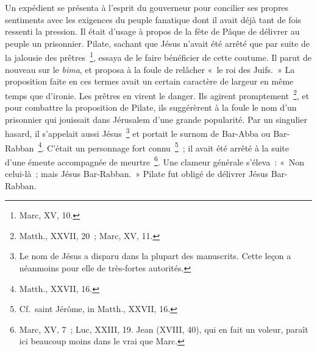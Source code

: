 \documentclass[french,twoside]{book} %
\begin{document}
Un expédient se présenta à l’esprit du gouverneur pour concilier ses propres sentiments avec les exigences du peuple fanatique dont il avait déjà tant de fois ressenti la pression. Il était d’usage à propos de la fête de Pâque de délivrer au peuple un prisonnier. Pilate, sachant que Jésus n’avait été arrêté que par suite de la jalousie des prêtres \footnote{Marc, XV, 10.}, essaya de le faire bénéficier de cette coutume. Il parut de nouveau sur le {\itshape bima}, et proposa à la foule de relâcher « le roi des Juifs. » La proposition faite en ces termes avait un certain caractère de largeur en même temps que d’ironie. Les prêtres en virent le danger. Ils agirent promptement \footnote{Matth., XXVII, 20 ; Marc, XV, 11.}, et pour combattre la proposition de Pilate, ils suggérèrent à la foule le nom d’un prisonnier qui jouissait dans Jérusalem d’une grande popularité. Par un singulier hasard, il s’appelait aussi Jésus \footnote{Le nom de Jésus a disparu dans la plupart des manuscrits. Cette leçon a néanmoins pour elle de très-fortes autorités.} et portait le surnom de Bar-Abba ou Bar-Rabban \footnote{Matth., XXVII, 16.}. C’était un personnage fort connu \footnote{Cf. saint Jérôme, in Matth., XXVII, 16.} ; il avait été arrêté à la suite d’une émeute accompagnée de meurtre \footnote{Marc, XV, 7 ; Luc, XXIII, 19. Jean (XVIII, 40), qui en fait un voleur, paraît ici beaucoup moins dans le vrai que Marc.}. Une clameur générale s’éleva : « Non celui-là ; mais Jésus Bar-Rabban. » Pilate fut obligé de délivrer Jésus Bar-Rabban.\par
\end{document}
